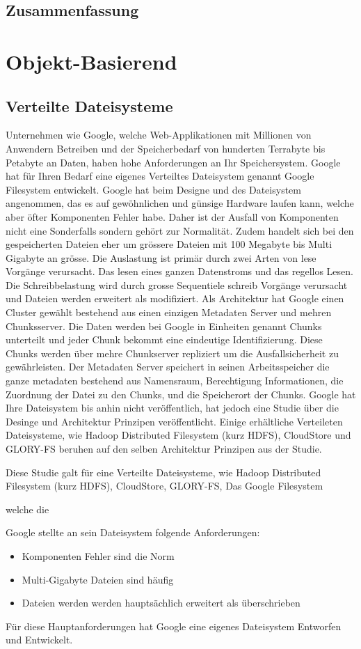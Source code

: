 \subsection{Zusammenfassung}


\section{Objekt-Basierend}

\subsection{Verteilte Dateisysteme}
Unternehmen wie Google, welche Web-Applikationen mit Millionen von Anwendern Betreiben und der Speicherbedarf von hunderten Terrabyte bis Petabyte an Daten,  haben hohe Anforderungen an Ihr Speichersystem. Google hat für Ihren Bedarf eine eigenes Verteiltes Dateisystem genannt Google Filesystem entwickelt. Google hat beim Designe und des Dateisystem angenommen, das es auf gewöhnlichen und günsige Hardware laufen kann, welche aber öfter Komponenten Fehler habe. Daher ist der Ausfall von Komponenten nicht eine Sonderfalls sondern gehört zur Normalität. Zudem handelt sich bei den gespeicherten Dateien eher um grössere Dateien mit 100 Megabyte bis Multi Gigabyte an grösse. Die Auslastung ist primär durch zwei Arten von lese Vorgänge verursacht. Das lesen eines ganzen Datenstroms und das regellos Lesen. Die Schreibbelastung wird durch grosse Sequentiele schreib Vorgänge verursacht und Dateien werden erweitert als modifiziert. Als Architektur hat Google einen Cluster gewählt bestehend aus einen einzigen Metadaten Server und mehren Chunksserver. Die Daten werden bei Google in Einheiten genannt Chunks unterteilt und jeder Chunk bekommt eine eindeutige Identifizierung. Diese Chunks werden über mehre Chunkserver repliziert um die Ausfallsicherheit zu gewährleisten. Der Metadaten Server speichert in seinen Arbeitsspeicher die ganze metadaten bestehend aus Namensraum, Berechtigung Informationen, die Zuordnung der Datei zu den Chunks, und die Speicherort der Chunks. Google hat Ihre Dateisystem bis anhin nicht veröffentlich, hat jedoch eine  Studie über die Desinge und Architektur Prinzipen veröffentlicht. Einige erhältliche Verteileten Dateisysteme, wie Hadoop Distributed Filesystem (kurz HDFS), CloudStore und GLORY-FS beruhen auf den selben Architektur Prinzipen aus der Studie.


 Diese Studie galt für eine Verteilte Dateisysteme, wie Hadoop Distributed Filesystem (kurz HDFS), CloudStore, GLORY-FS,
 Das Google Filesystem 

welche die


 Google stellte an sein Dateisystem folgende Anforderungen: 
\begin{itemize}
\item Komponenten Fehler sind die Norm
\item Multi-Gigabyte Dateien sind häufig
\item Dateien werden werden hauptsächlich erweitert als überschrieben
\end{itemize}

Für diese Hauptanforderungen hat Google eine eigenes Dateisystem Entworfen und Entwickelt.



